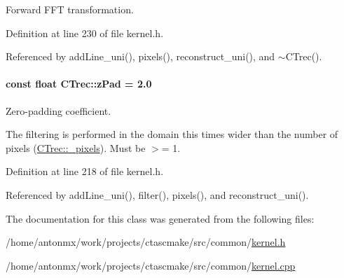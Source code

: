 Forward FFT transformation. 



Definition at line 230 of file kernel.h.



Referenced by addLine\_\-uni(), pixels(), reconstruct\_\-uni(), and $\sim$CTrec().

\hypertarget{classCTrec_ac13bcb5f9e53622aa19d440684fa7273}{
\paragraph[{zPad}]{\setlength{\rightskip}{0pt plus 5cm}const float {\bf CTrec::zPad} = 2.0}\hfill}
\label{classCTrec_ac13bcb5f9e53622aa19d440684fa7273}


Zero-\/padding coefficient. 

The filtering is performed in the domain this times wider than the number of pixels (\hyperlink{classCTrec_a91849845389f46350ac0bc79e2e43486}{CTrec::\_\-pixels}). Must be $>$= 1. 

Definition at line 218 of file kernel.h.



Referenced by addLine\_\-uni(), filter(), pixels(), and reconstruct\_\-uni().



The documentation for this class was generated from the following files:\begin{DoxyCompactItemize}
\item 
/home/antonmx/work/projects/ctascmake/src/common/\hyperlink{kernel_8h}{kernel.h}\item 
/home/antonmx/work/projects/ctascmake/src/common/\hyperlink{kernel_8cpp}{kernel.cpp}\end{DoxyCompactItemize}
